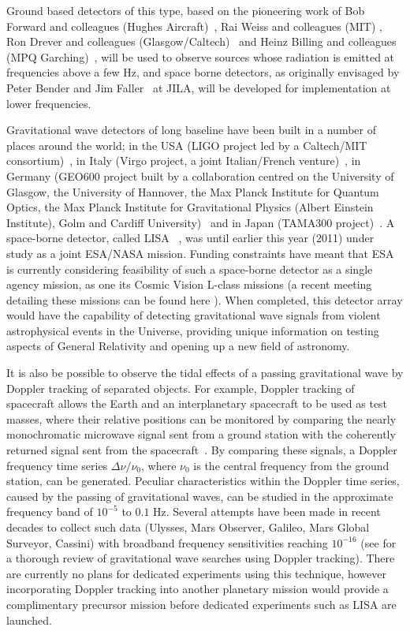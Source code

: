 \documentclass{article}
\begin{document}
Ground based detectors of this type, based on the pioneering work of Bob Forward
and colleagues (Hughes Aircraft)~\cite{Forward}, Rai Weiss and colleagues (MIT)
\cite{Weiss}, Ron Drever and colleagues (Glasgow/Caltech)~\cite{Drever1,
Drever2} and Heinz Billing and colleagues (MPQ Garching)~\cite{Billing}, will be
used to observe sources whose radiation is emitted at frequencies above a few
Hz, and space borne detectors, as originally envisaged by Peter Bender and Jim
Faller~\cite{BenderFaller1, BenderFaller2} at JILA, will be developed for
implementation at lower frequencies.

Gravitational wave detectors of long baseline have been built in a number of
places around the world; in the USA (LIGO project led by a Caltech/MIT
consortium)~\cite{LIGOS5, LIGOweb}, in Italy (Virgo project, a joint
Italian/French venture)~\cite{Acernese:2007, VIRGOweb}, in Germany (GEO600
project built by a collaboration centred on the University of Glasgow, the
University of Hannover, the Max Planck Institute for Quantum Optics, the Max
Planck Institute for Gravitational Physics (Albert Einstein Institute), Golm and
Cardiff University)~\cite{Willke:2007, GEOweb} and in Japan (TAMA300
project)~\cite{TAMAStatus, TAMAweb}. A space-borne detector, called LISA
~\cite{LISA, NASAweb, ESAweb}, was until earlier this year (2011) under study as
a joint ESA/NASA mission. Funding constraints have meant that ESA is currently
considering feasibility of such a space-borne detector as a single agency
mission, as one its Cosmic Vision L-class missions (a recent meeting detailing
these missions can be found here \cite{ESACosmicVisions}). When completed, this
detector array would have the capability of detecting gravitational wave signals
from violent astrophysical events in the Universe, providing unique information
on testing aspects of General Relativity and opening up a new field of
astronomy.

It is also be possible to observe the tidal effects of a passing gravitational
wave by Doppler tracking of separated objects.  For example, Doppler tracking of
spacecraft allows the Earth and an interplanetary spacecraft to be used as test
masses, where their relative positions can be monitored by comparing the nearly
monochromatic microwave signal sent from a ground station with the coherently
returned signal sent from the spacecraft~\cite{Estabrook:1975}.  By comparing
these signals, a Doppler frequency time series $\Delta \nu / \nu_0$, where
$\nu_0$ is the central frequency from the ground station, can be generated.
Peculiar characteristics within the Doppler time series, caused by the passing
of gravitational waves, can be studied in the approximate frequency band of
$10^{-5}$ to $0.1$ Hz. Several attempts have been made in recent decades to
collect such data (Ulysses, Mars Observer, Galileo, Mars Global Surveyor,
Cassini) with broadband frequency sensitivities reaching $10^{-16}$ (see
\cite{Armstrong:2006} for a thorough review of gravitational wave searches using
Doppler tracking). There are currently no plans for dedicated experiments using
this technique, however incorporating Doppler tracking into another planetary
mission would provide a complimentary precursor mission before dedicated
experiments such as LISA are launched.
\end{document}
